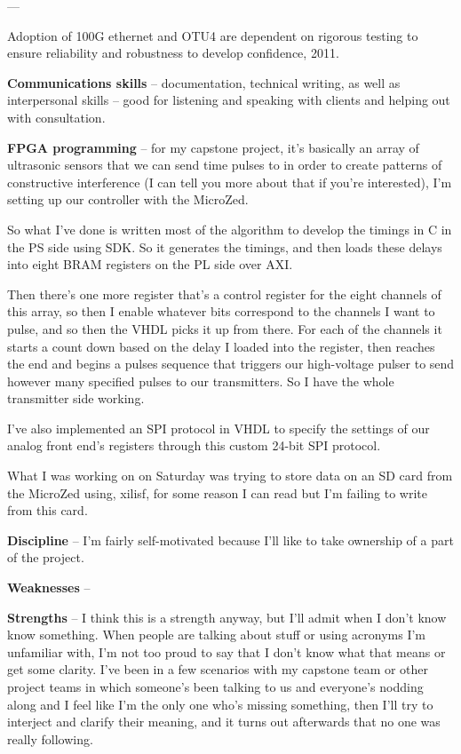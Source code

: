 \documentclass{IEEEtran}
\begin{document}
---

Adoption of 100G ethernet and OTU4 are dependent on rigorous testing to ensure reliability and robustness to develop confidence, 2011.


\textbf{Communications skills} -- documentation, technical writing, as well as interpersonal skills -- good for listening and speaking with clients and helping out with consultation.


\textbf{FPGA programming} -- for my capstone project, it's basically an array of ultrasonic sensors that we can send time pulses to in order to create patterns of constructive interference (I can tell you more about that if you're interested), I'm setting up our  controller with the MicroZed. 

So what I've done is written most of the algorithm to develop the timings in C in the PS side using SDK. So it generates the timings, and then loads these delays into eight BRAM registers on the PL side over AXI.

Then there's one more register that's a control register for the eight channels of this array, so then I enable whatever bits correspond to the channels I want to pulse, and so then the VHDL picks it up from there. For each of the channels it starts a count down based on the delay I loaded into the register, then reaches the end and begins a pulses sequence that triggers our high-voltage pulser to send however many specified pulses to our transmitters. So I have the whole transmitter side working.

I've also implemented an SPI protocol in VHDL to specify the settings of our analog front end's registers through this custom 24-bit SPI protocol.

What I was working on on Saturday was trying to store data on an SD card from the MicroZed using, xilisf, for some reason I can read but I'm failing to write from this card.


\textbf{Discipline} -- I'm fairly self-motivated because I'll like to take ownership of a part of the project.

\textbf{Weaknesses} --

\textbf{Strengths} -- I think this is a strength anyway, but I'll admit when I don't know know something. When people are talking about stuff or using acronyms I'm unfamiliar with, I'm not too proud to say that I don't know what that means or get some clarity. I've been in a few scenarios with my capstone team or other project teams in which someone's been talking to us and everyone's nodding along and I feel like I'm the only one who's missing something, then I'll try to interject and clarify their meaning, and it turns out afterwards that no one was really following.
\end{document}
